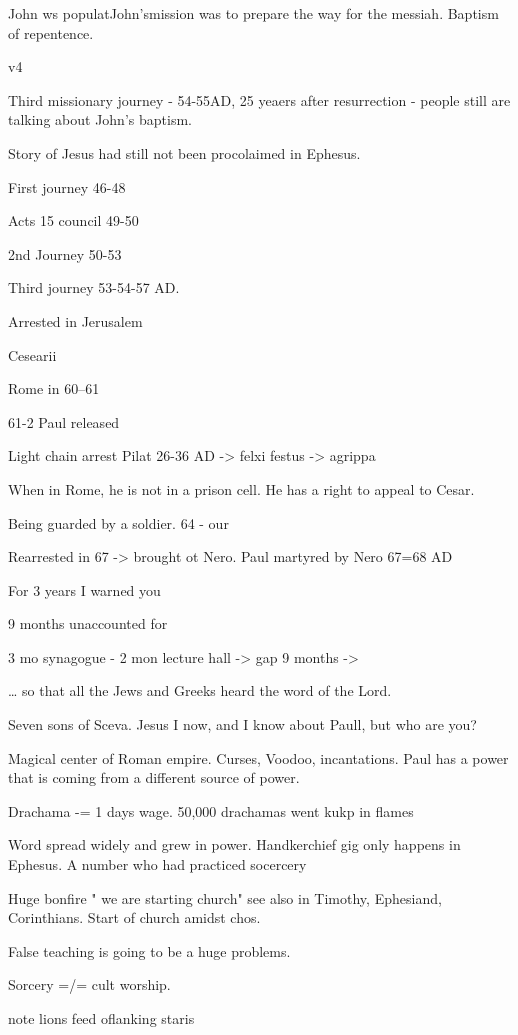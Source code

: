 \documentclass[
]{book}
\begin{document}
John ws populatJohn'smission was to prepare the way for the messiah. Baptism of repentence.

v4

Third missionary journey - 54-55AD, 25 yeaers after resurrection - people still are talking about John's baptism.

Story of Jesus had still not been procolaimed in Ephesus.

First journey 46-48

Acts 15 council 49-50

2nd Journey 50-53

Third journey 53-54-57 AD.

Arrested in Jerusalem

Cesearii

Rome in 60--61

61-2 Paul released

Light chain arrest Pilat 26-36 AD -\textgreater{} felxi festus -\textgreater{} agrippa

When in Rome, he is not in a prison cell. He has a right to appeal to Cesar.

Being guarded by a soldier. 64 - our

Rearrested in 67 -\textgreater{} brought ot Nero. Paul martyred by Nero 67=68 AD

For 3 years I warned you

9 months unaccounted for

3 mo synagogue - 2 mon lecture hall -\textgreater{} gap 9 months -\textgreater{}

\ldots{} so that all the Jews and Greeks heard the word of the Lord.

Seven sons of Sceva. Jesus I now, and I know about Paull, but who are you?

Magical center of Roman empire. Curses, Voodoo, incantations. Paul has a power that is coming from a different source of power.

Drachama -= 1 days wage. 50,000 drachamas went kukp in flames

Word spread widely and grew in power. Handkerchief gig only happens in Ephesus. A number who had practiced socercery

Huge bonfire " we are starting church" see also in Timothy, Ephesiand, Corinthians. Start of church amidst chos.

False teaching is going to be a huge problems.

Sorcery =/= cult worship.

note lions feed oflanking staris
\end{document}
